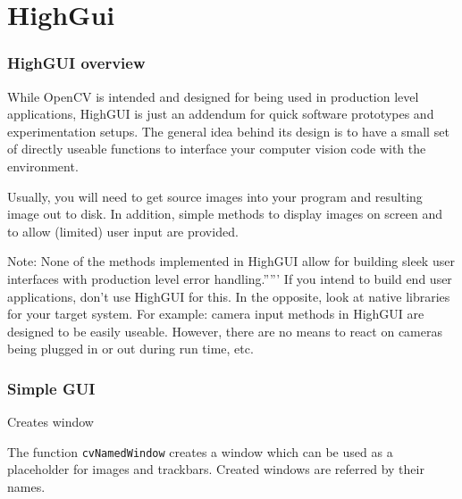 \chapter{HighGui}

\subsection{HighGUI overview}

While OpenCV is intended and designed for being used in production level
applications, HighGUI is just an addendum for quick software prototypes
and experimentation setups. The general idea behind its design is to
have a small set of directly useable functions to interface your computer
vision code with the environment.

Usually, you will need to get source images into your program and
resulting image out to disk. In addition, simple methods to display
images on screen and to allow (limited) user input are provided.

Note: None of the methods implemented in HighGUI allow for building
sleek user interfaces with production level error handling.''''' If you
intend to build end user applications, don't use HighGUI for this. In
the opposite, look at native libraries for your target system. For
example: camera input methods in HighGUI are designed to be easily
useable. However, there are no means to react on cameras being plugged
in or out during run time, etc.

\subsection{Simple GUI}


Creates window


\begin{description}
\end{description}

The function \texttt{cvNamedWindow} creates a window which can be used as a placeholder for images and trackbars. Created windows are referred by their names.

